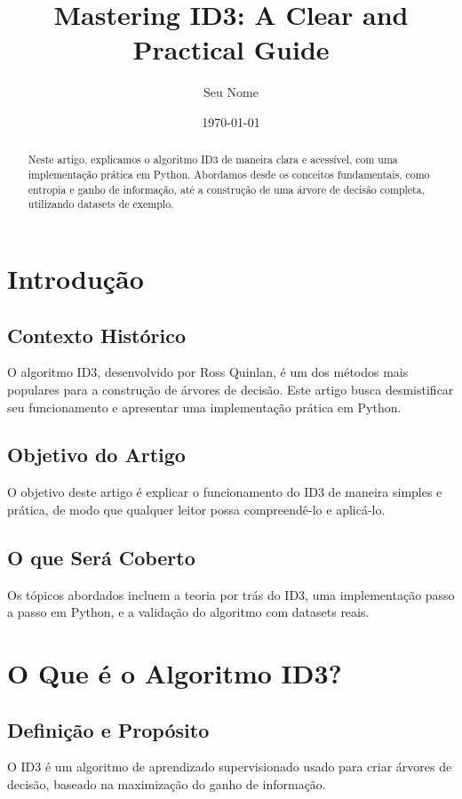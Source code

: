 \documentclass{article}
\title{Mastering ID3: A Clear and Practical Guide}
\author{Seu Nome}
\date{\today}
\begin{document}
\maketitle

\begin{abstract}
Neste artigo, explicamos o algoritmo ID3 de maneira clara e acessível, com uma implementação prática em Python. Abordamos desde os conceitos fundamentais, como entropia e ganho de informação, até a construção de uma árvore de decisão completa, utilizando datasets de exemplo.
\end{abstract}

\section{Introdução}
\subsection{Contexto Histórico}
O algoritmo ID3, desenvolvido por Ross Quinlan, é um dos métodos mais populares para a construção de árvores de decisão. Este artigo busca desmistificar seu funcionamento e apresentar uma implementação prática em Python.

\subsection{Objetivo do Artigo}
O objetivo deste artigo é explicar o funcionamento do ID3 de maneira simples e prática, de modo que qualquer leitor possa compreendê-lo e aplicá-lo.

\subsection{O que Será Coberto}
Os tópicos abordados incluem a teoria por trás do ID3, uma implementação passo a passo em Python, e a validação do algoritmo com datasets reais.

\section{O Que é o Algoritmo ID3?}
\subsection{Definição e Propósito}
O ID3 é um algoritmo de aprendizado supervisionado usado para criar árvores de decisão, baseado na maximização do ganho de informação.
\end{document}

